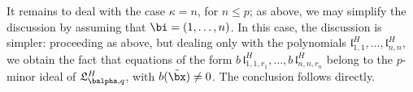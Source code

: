 \documentclass[12pt]{article}
\begin{document}
It remains to deal with the case $\kappa=n$, for $n \le p$; as above,
we may simplify the discussion by assuming that $\bi=(1,\dots,n)$. In
this case, the discussion is simpler: proceeding as above, but dealing
only with the polynomials
$\mathfrak{l}^H_{1,1},\dots,\mathfrak{l}^H_{n,n}$, we obtain the fact
that equations of the form $b\, \mathfrak{l}^H_{1,1,r_1},\dots,b\,
\mathfrak{l}^H_{n,n,r_n}$ belong to the $p$-minor ideal of
$\mathfrak{L}^H_{\balpha,q}$, with $b(\tilde\bx) \ne 0$. The
conclusion follows directly.


 
\end{document}
